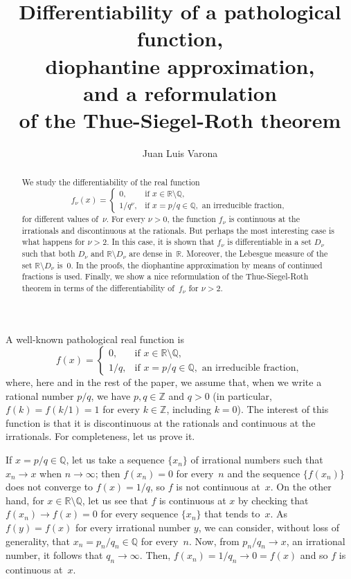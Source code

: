 \documentclass[11pt,a4paper,reqno]{amsart}
\title[Differentiability and diophantine approximation]%
{Differentiability of a pathological function,\\ 
diophantine approximation,\\
and a reformulation\\ of the Thue-Siegel-Roth theorem}
\author[J. L. Varona]{Juan Luis Varona}
\def\R{\mathbb{R}}
\def\Q{\mathbb{Q}}
\def\Z{\mathbb{Z}}
\theoremstyle{plain}
\theoremstyle{definition}
\begin{document}

\begin{abstract}
We study the differentiability of the real function
$$
  f_\nu(x) =
\begin{cases}
  0, & \text{if } x \in \mathbb{R} \setminus \mathbb{Q}, \\
  1/q^\nu, & \text{if } x = p/q \in \mathbb{Q}, \text{ an irreducible fraction},
\end{cases}
$$
for different values of~$\nu$.
For every $\nu > 0$, the function $f_\nu$ is continuous at the irrationals and discontinuous at the rationals. But perhaps the most interesting case is what happens for $\nu > 2$. 
In this case, it is shown that $f_\nu$ is differentiable in a set $D_\nu$ such that both $D_\nu$ and $\R \setminus D_\nu$ are dense in~$\R$. Moreover, the Lebesgue measure of the set $\R \setminus D_\nu$ is~$0$. 
In the proofs, the diophantine approximation by means of continued fractions is used.
Finally, we show a nice reformulation of the Thue-Siegel-Roth theorem in terms of the differentiability of~$f_\nu$ for $\nu > 2$.
\end{abstract}

\maketitle

A well-known pathological real function is
$$
  f(x) =
\begin{cases}
  0, & \text{if } x \in \R \setminus \Q, \\
  1/q, & \text{if } x = p/q \in \Q, \text{ an irreducible fraction},
\end{cases}
$$
where, here and in the rest of the paper, we assume that, when we write a rational number $p/q$, we have $p,q \in \Z$ and $q>0$ (in particular, $f(k) = f(k/1) = 1$ for every $k \in \Z$, including $k=0$). The interest of this function is that it is discontinuous at the rationals and continuous at the irrationals. For completeness, let us prove it.

If $x = p/q \in \Q$, let us take a sequence $\{x_n\}$ of irrational numbers such that $x_n \to x$ when $n \to \infty$; then $f(x_n)=0$ for every~$n$ and the sequence $\{f(x_n)\}$ does not converge to $f(x) = 1/q$, so $f$ is not continuous at~$x$. On the other hand, for $x \in \R \setminus \Q$, let us see that $f$ is continuous at $x$ by checking that $f(x_n) \to f(x) = 0$ for every sequence $\{x_n\}$ that tends to~$x$. As $f(y) = f(x)$ for every irrational number $y$, we can consider, without loss of generality, that $x_n = p_n/q_n \in \Q$ for every~$n$. Now, from $p_n/q_n \to x$, an irrational number, it follows that $q_n \to \infty$. Then, $f(x_n) = 1/q_n \to 0 = f(x)$ and so $f$ is continuous at~$x$.
\end{document}
